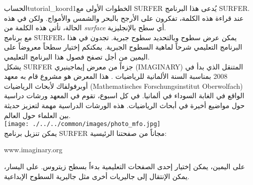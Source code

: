 \begin{surferIntroPage}{الحساب}{tutorial_koord1}{الخطوات الأولى مع SURFER}
يُدعى هذا البرنامج \textenglish{SURFER}. عند قراءة هذه الكلمة، تفكرون على الأرجح بالبحر والشمس والأمواج. ولكن في هذه الحالة، تأتي هذه الكلمة من \textenglish{\it surface} أي سطح بالإنجليزية.
\\
مع برنامج \textenglish{SURFER}، يمكن عرض سطوح وبالتحديد سطوح جبرية. تجدون في هذا البرنامج التعليمي شرحاً لماهية السطوح الجبرية. يمكنكم إختيار سطحاً معروضاً على اليمين من أجل تصفح فصول هذا البرنامج التعليمي.\\
يشكل \textenglish{SURFER} جزءاً من معرض إيماجينيري
 \textenglish{(IMAGINARY)}
  المتنقل الذي بدأ في 2008 بمناسبة السنة الألمانية للرياضيات . هذا المعرض هو مشروع قام به معهد أوبرفولفاك لأبحاث الرياضيات
\textenglish{(Mathematisches Forschungsinstitut Oberwolfach)}
 الواقع في الغابة السوداء في ألمانيا. في كل اسبوع، تقوم في المعهد ورشات دراسية حول مواضيع أخيرة في أبحاث الرياضيات. هذه الورشات الدراسية مهمة لتعزيز حديثة بين العلماء حول العالم. \\
\vspace{0.2cm} \hspace{3.5cm}\texttt{[image: ./../../common/images/photo\_mfo.jpg]}\\
يمكن تنزيل برنامج \textenglish{SURFER} مجاناً من صفحتنا الرئيسية: \\
\begin{centering}
\textenglish{www.imaginary.org}\\
\end{centering}
 \vspace{0.2cm}
على اليمين، يمكن إختيار إحدى الصفحات التعليمية بدءاً بسطح زيتروس.
  على اليسار، يمكن الإنتقال إلى جاليريات أخرى مثل جاليرية السطوح الإبداعية.
\end{surferIntroPage}
